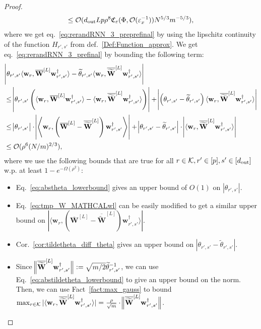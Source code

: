 \begin{proof}
\begin{align}
				\le \mathcal{O}(d_{\mathrm{out}} Lp\rho^8  \mathfrak{C}_{\varepsilon}(\Phi, \mathcal{O}(\varepsilon_x^{-1})) N^{5/3} m^{-5/3}) \nonumber,
			\end{align}
			\endgroup
			where we get eq.~\ref{eq:rerandRNN_3_preprefinal} by using the lipschitz continuity of the function $H_{r', s'}$ from def.~\ref{Def:Function_approx}. We get eq.~\ref{eq:rerandRNN_3_prefinal} by bounding the following term:
			\begin{align*}
				&\abs{\theta_{r', s'} \langle \mathbf{w}_{r}, \overline{\mathbf{W}}^{[L]} \mathbf{w}_{r', s'}^{\dagger}\rangle -  \widetilde{\theta}_{r', s'} \langle \mathbf{w}_{r}, \overline{\widetilde{\mathbf{W}}}^{[L]} \mathbf{w}_{r', s'}^{\dagger}\rangle} \\&
				\le \abs{\theta_{r', s'} \left(\langle \mathbf{w}_{r}, \overline{\mathbf{W}}^{[L]} \mathbf{w}_{r', s'}^{\dagger}\rangle -  \langle \mathbf{w}_{r}, \overline{\widetilde{\mathbf{W}}}^{[L]} \mathbf{w}_{r', s'}^{\dagger}\rangle\right)} + \abs{\left(\theta_{r', s'} - \widetilde{\theta}_{r', s'} \right) \langle \mathbf{w}_{r}, \overline{\widetilde{\mathbf{W}}}^{[L]} \mathbf{w}_{r', s'}^{\dagger}\rangle} \\&
				\le \abs{\theta_{r', s'}} \cdot \abs{\left\langle \mathbf{w}_{r}, \left(\overline{\mathbf{W}}^{[L]} -  \overline{\widetilde{\mathbf{W}}}^{[L]} \right) \mathbf{w}_{r', s'}^{\dagger}\right\rangle} + \abs{\theta_{r', s'} - \widetilde{\theta}_{r', s'} } \cdot \abs{ \langle \mathbf{w}_{r}, \overline{\widetilde{\mathbf{W}}}^{[L]} \mathbf{w}_{r', s'}^{\dagger}\rangle} \\&
				\le \mathcal{O}(\rho^6 (N/m)^{2/3}),
			\end{align*}
			where we use the following bounds that are true for all $r \in \mathcal{K}, r' \in [p], s' \in [d_{\mathrm{out}} ]$ w.p. at least $1-e^{-\Omega(\rho^2)}$:
			\begin{itemize}
				\item Eq.~\ref{eq:abstheta_lowerbound} gives an upper bound of $O(1)$ on $|\theta_{r',s'}|$.
				\item Eq.~\ref{eq:tmp_W_MATHCALwl} can be easily modified to get a similar upper bound on $|\langle \mathbf{w}_{r}, (\overline{\mathbf{W}}^{[L]} -  \overline{\widetilde{\mathbf{W}}}^{[L]} ) \mathbf{w}_{r', s'}^{\dagger}\rangle |$.
				\item Cor.~\ref{cor:tildetheta_diff_theta} gives an upper bound on $|\theta_{r',s'} - \widetilde{\theta}_{r',s'}|$.
				\item Since $\norm[2]{\overline{\widetilde{\mathbf{W}}}^{[L]} \mathbf{w}_{r', s'}^{\dagger}} := \sqrt{m/2} \widetilde{\theta}_{r', s'}^{-1}$, we can use Eq.~\ref{eq:abstildetheta_lowerbound} to give an upper bound on the norm. Then, we can use Fact~\ref{fact:max_gauss} to bound $\max_{r \in \mathcal{K}} |\langle \mathbf{w}_r, \overline{\widetilde{\mathbf{W}}}^{[L]} \mathbf{w}_{r', s'}^{\dagger}\rangle| = \frac{\rho}{\sqrt{m}} \cdot \norm[2]{\overline{\widetilde{\mathbf{W}}}^{[L]} \mathbf{w}_{r', s'}^{\dagger}}$.
			\end{itemize}
		\end{proof}
